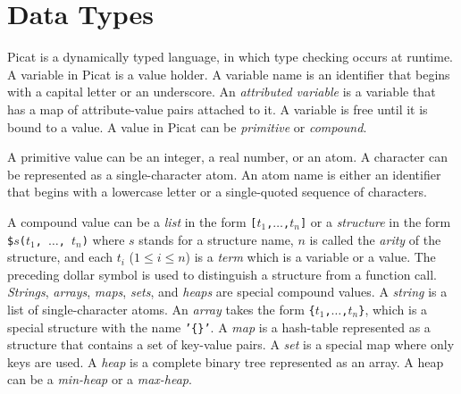 
\section{Data Types}
Picat is a dynamically typed language, in which type checking occurs at runtime. A variable in Picat is a value holder. A variable name is an identifier that begins with a capital letter or an underscore. An \emph{attributed variable} is a variable that has a map of attribute-value pairs attached to it. A variable is free until it is bound to a value. A value in Picat can be \emph{primitive} or \emph{compound}. 

A primitive value can be an integer, a real number, or an atom. A character can be represented as a single-character atom.  An atom name is either an identifier that begins with a lowercase letter or a single-quoted sequence of characters.

A compound value can be a \emph{list} in the form \texttt{[$t_1$,$\ldots$,$t_{n}$]} or a \emph{structure} in the form \texttt{\$$s$($t_1$, $\ldots$, $t_{n}$)} where $s$ stands for a structure name, $n$ is called the \emph{arity} of the structure, and each $t_i$ ($1\le i \le n$) is a \emph{term} which is a variable or a value. The preceding dollar symbol is used to distinguish a structure from a function call. \emph{Strings}, \emph{arrays}, \emph{maps}, \emph{sets}, and \emph{heaps} are special compound values. A \emph{string} is a list of single-character atoms. An \emph{array} takes the form \texttt{\{$t_1$,$\ldots$,$t_{n}$\}}, which is a special structure with the name \texttt{'\{\}'}. A \emph{map} is a hash-table represented as a structure that contains a set of key-value pairs. A \emph{set} is a special map where only keys are used.  A \emph{heap} is a complete binary tree represented as an array. A heap can be a \emph{min-heap} or a \emph{max-heap}.

